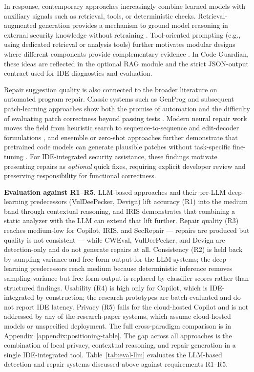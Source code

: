 In response, contemporary approaches increasingly combine learned models with auxiliary signals such as retrieval, tools, or deterministic checks. Retrieval-augmented generation provides a mechanism to ground model reasoning in external security knowledge without retraining \cite{lewis2020rag,karpukhin2020dpr}. Tool-oriented prompting (e.g., using dedicated retrieval or analysis tools) further motivates modular designs where different components provide complementary evidence \cite{schick2023toolformer}. In Code Guardian, these ideas are reflected in the optional RAG module and the strict JSON-output contract used for IDE diagnostics and evaluation.

Repair suggestion quality is also connected to the broader literature on automated program repair. Classic systems such as GenProg and subsequent patch-learning approaches show both the promise of automation and the difficulty of evaluating patch correctness beyond passing tests \cite{weimer2009genprog,monperrus2014critique}. Modern neural repair work moves the field from heuristic search to sequence-to-sequence and edit-decoder formulations \cite{chen2019sequencer,zhu2021recoder}, and ensemble or zero-shot approaches further demonstrate that pretrained code models can generate plausible patches without task-specific fine-tuning \cite{lutellier2020coconut,xia2022alpharepair}. For IDE-integrated security assistance, these findings motivate presenting repairs as \emph{optional} quick fixes, requiring explicit developer review and preserving responsibility for functional correctness.

\label{subsubsec:eval-llm}%
\noindent\textbf{Evaluation against R1--R5.} 
LLM-based approaches and their pre-LLM deep-learning predecessors (VulDeePecker, Devign) lift accuracy (R1) into the medium band through contextual reasoning, and IRIS demonstrates that combining a static analyzer with the LLM can extend that lift further. Repair quality (R3) reaches medium-low for Copilot, IRIS, and SecRepair --- repairs are produced but quality is not consistent --- while CWEval, VulDeePecker, and Devign are detection-only and do not generate repairs at all. Consistency (R2) is held back by sampling variance and free-form output for the LLM systems; the deep-learning predecessors reach medium because deterministic inference removes sampling variance but free-form output is replaced by classifier scores rather than structured findings. Usability (R4) is high only for Copilot, which is IDE-integrated by construction; the research prototypes are batch-evaluated and do not report IDE latency. Privacy (R5) fails for the cloud-hosted Copilot and is not addressed by any of the research-paper systems, which assume cloud-hosted models or unspecified deployment. The full cross-paradigm comparison is in Appendix~\ref{appendix:positioning-table}. The gap across all approaches is the combination of local privacy, contextual reasoning, and repair generation in a single IDE-integrated tool. Table~\ref{tab:eval-llm} evaluates the LLM-based detection and repair systems discussed above against requirements R1--R5.

